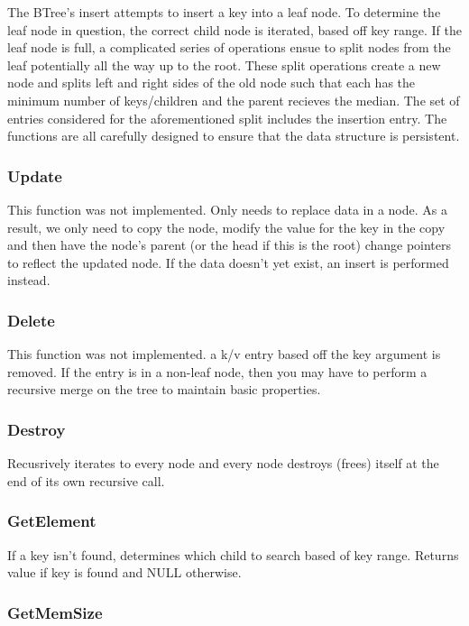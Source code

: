 \documentclass[twocolumn]{article}
\begin{document}
The BTree's insert attempts to insert a key into a leaf node. To determine the
leaf node in question, the correct child node is iterated, based off key range.
If the leaf node is full, a complicated series of operations ensue to split
nodes from the leaf potentially all the way up to the root. These split
operations create a new node and splits left and right sides of the old node
such that each has the minimum number of keys/children and the parent recieves
the median. The set of entries considered for the aforementioned split includes
the insertion entry. The functions are all carefully designed to ensure that the
data structure is persistent.

\subsubsection{Update}

This function was not implemented. Only needs to replace data in a node. As a
result, we only need to copy the node, modify the value for the key in the copy
and then have the node's parent (or the head if this is the root) change
pointers to reflect the updated node. If the data doesn't yet exist, an insert
is performed instead.

\subsubsection{Delete}

This function was not implemented. a k/v entry based off the key argument is
removed. If the entry is in a non-leaf node, then you may have to perform a
recursive merge on the tree to maintain basic properties.

\subsubsection{Destroy}

Recusrively iterates to every node and every node destroys (frees) itself at the
end of its own recursive call.

\subsubsection{GetElement}

If a key isn't found, determines which child to search based of key range.
Returns value if key is found and NULL otherwise.

\subsubsection{GetMemSize}
\end{document}

